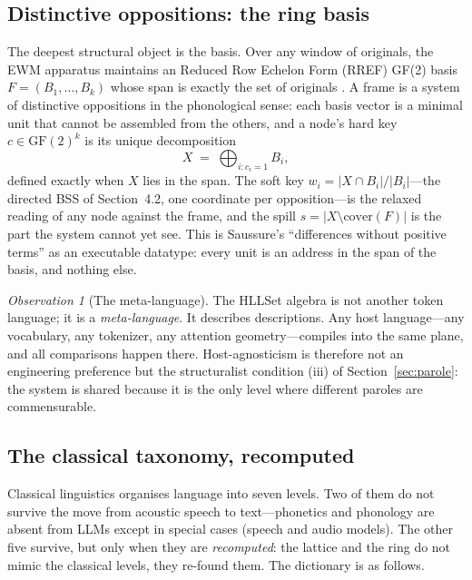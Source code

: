 \documentclass[11pt,a4paper]{article}
\theoremstyle{remark}
\newtheorem{observation}[principle]{Observation}
\begin{document}
\subsection{Distinctive oppositions: the ring basis}
The deepest structural object is the basis. Over any window of originals, the
EWM apparatus maintains an Reduced Row Echelon Form (RREF) GF(2) basis $F = (B_1,\dots,B_k)$ whose span is
exactly the set of originals \cite{state2026}. A frame is a system of
distinctive oppositions in the phonological sense: each basis vector is a
minimal unit that cannot be assembled from the others, and a node's hard key
$c \in \mathrm{GF}(2)^k$ is its unique decomposition
\[
  X \;=\; \bigoplus_{i : c_i = 1} B_i,
\]
defined exactly when $X$ lies in the span. The soft key
$w_i = |X \cap B_i| / |B_i|$---the directed BSS of Section~4.2, one coordinate
per opposition---is the relaxed reading of any node against the frame, and the
spill
$s = |X \setminus \mathrm{cover}(F)|$ is the part the system cannot yet see.
This is Saussure's ``differences without positive terms'' as an executable
datatype: every unit is an address in the span of the basis, and nothing else.

\begin{observation}[The meta-language]
The HLLSet algebra is not another token language; it is a \emph{meta-language}.
It describes descriptions. Any host language---any vocabulary, any tokenizer,
any attention geometry---compiles into the same plane, and all comparisons
happen there. Host-agnosticism is therefore not an engineering preference but
the structuralist condition (iii) of Section~\ref{sec:parole}: the system is
shared because it is the only level where different paroles are commensurable.
\end{observation}

\subsection{The classical taxonomy, recomputed}
Classical linguistics organises language into seven levels. Two of them do not
survive the move from acoustic speech to text---phonetics and phonology are
absent from LLMs except in special cases (speech and audio models). The other
five survive, but only when they are \emph{recomputed}: the lattice and the
ring do not mimic the classical levels, they re-found them. The dictionary is
as follows.
\end{document}

